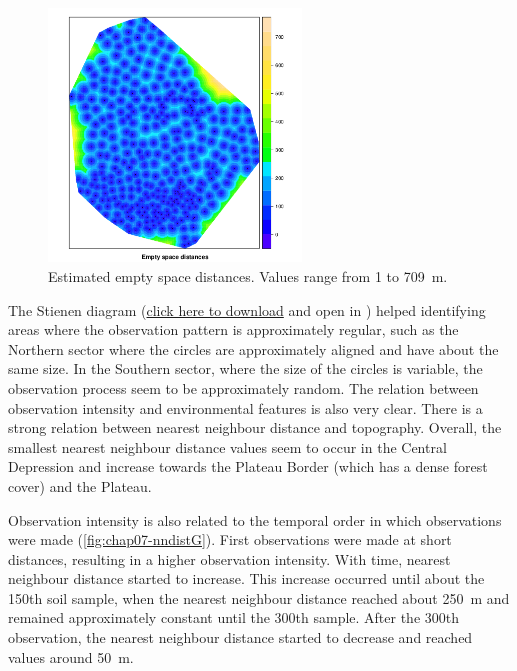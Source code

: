 \begin{figure}[!ht]
\centering
\includegraphics[width=0.6\textwidth]{fig/chap07-empty-space}
\caption[Estimated empty space distances.]{Estimated empty space distances. Values range from \num{1} to 
\SI{709}{\m}.}
\label{fig:chap07-intensity}
\end{figure}

The Stienen diagram (\href{https://www.dropbox.com/s/m00seobmpl5qtui/stienen.kml?dl=0}{click
here to download} and open in \googleearth) helped identifying areas where the observation pattern is 
approximately regular, such as the Northern sector where the circles are approximately aligned and have about 
the same size. In the Southern sector, where the size of the circles is variable, the observation process seem 
to be approximately random. The relation between observation intensity and environmental features is also very 
clear. There is a strong relation between nearest neighbour distance and topography. Overall, the smallest 
nearest neighbour distance values seem to occur in the Central Depression and increase towards the Plateau 
Border (which has a dense forest cover) and the Plateau.

Observation intensity is also related to the temporal order in which observations were made 
(\autoref{fig:chap07-nndistG}). First observations were made at short distances, resulting in a higher 
observation intensity. With time, nearest neighbour distance started to increase. This increase occurred until 
about the \num{150}th soil sample, when the nearest neighbour distance reached about \SI{250}{\m} and 
remained approximately constant until the \num{300}th sample. After the \num{300}th observation, the 
nearest neighbour distance started to decrease and reached values around \SI{50}{\m}.

